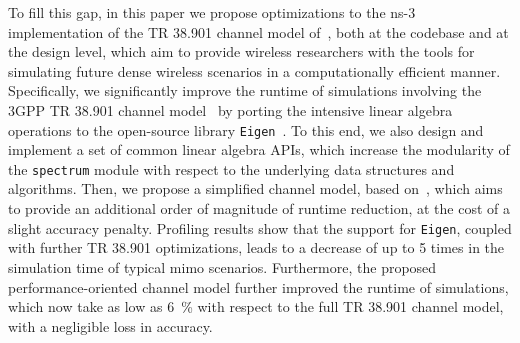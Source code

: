 To fill this gap, in this paper we propose optimizations to the ns-3 implementation of the TR 38.901 channel model of~\cite{tommaso:20}, both at the codebase and at the design level, which aim to provide wireless researchers with the tools for simulating future dense wireless scenarios in a computationally efficient manner. Specifically, we significantly improve the runtime of simulations involving the 3GPP TR 38.901 channel model~\cite{TR38901} by porting the intensive linear algebra operations to the open-source library \texttt{Eigen}~\cite{eigenweb}. To this end, we also design and implement a set of common linear algebra APIs, which increase the modularity of the \texttt{spectrum} module with respect to the underlying data structures and algorithms.
Then, we propose a simplified channel model, based on~\cite{TR38901}, which aims to provide an additional order of magnitude of runtime reduction, at the cost of a slight accuracy penalty. Profiling results show that the support for \texttt{Eigen}, coupled with further TR 38.901 optimizations, leads to a decrease of up to 5 times in the simulation time of typical \gls{mimo} scenarios. Furthermore, the proposed performance-oriented channel model further improved the runtime of simulations, which now take as low as $6$~\% with respect to the full TR 38.901 channel model, with a negligible loss in accuracy.
